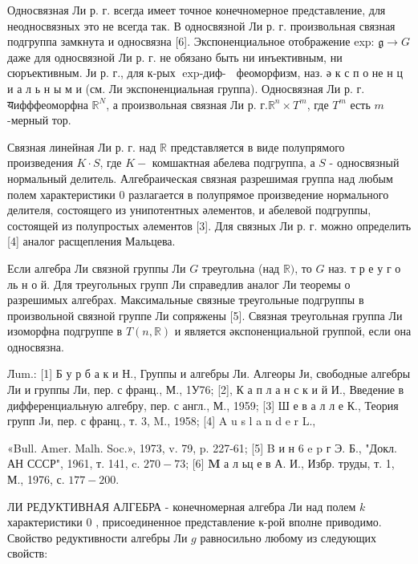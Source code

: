 \documentclass[10pt]{article}
\begin{document}
Односвязная Ли р. г. всегда имеет точное конечномерное представление, для неодносвязных это не всегда так. В односвязной Ли р. г. произвольная связная подгруппа замкнута и односвязна [6]. Экспоненциальное отображение exp: $\mathfrak{g} \rightarrow G$ даже для односвязной Ли р. г. не обязано быть ни инъективным, ни сюръективным. Ји р. г., для к-рых $\operatorname{exp-диф-~}$ феоморфизм, наз. ә к с п о не н ц и а л ь н ы м и (см. Ли экспоненциальная группа). Односвязная Ли р. г. यифффеоморфна $\mathbb{R}^{N}$, а произвольная связная Ли р. г.$\mathbb{R}^{n} \times T^{m}$, где $T^{m}$ есть $m$-мерный тор.



Связная линейная Ли р. г. над $\mathbb{R}$ представляется в виде полупрямого произведения $K \cdot S$, где $K-$ комшактная абелева подгруппа, а $S$ - односвязный нормальный делитель. Алгебраическая связная разрешимая группа над любым полем характеристики 0 разлагается в полупрямое произведение нормального делителя, состоящего из унипотентных әлементов, и абелевой подгруппы, состоящей из полупростых әлементов [3]. Для связных Ли р. г. можно определить [4] аналог расщепления Мальцева.



Если алгебра Ли связной группы Ли $G$ треугольна (над $\mathbb{R})$, то $G$ наз. т р е у г о ль н о й. Для треугольных групп Ли справедлив аналог Ли теоремы о разрешимых алгебрах. Максимальные связные треугольные подгруппы в произвольной связной группе Ли сопряжены [5]. Связная треугольная группа Ли изоморфна подгруппе в $T(n, \mathbb{R})$ и является әкспоненциальной группой, если она односвязна.



Лum.: [1] Б у р б а к и Н., Группы и алгебры Ли. Алгеоры Ји, свободные алгебры Ли и группы Ли, пер. с франц., М., 1У76; [2], К а п л а н с к и й И., Введение в дифференциальную алгебру, пер. с англ., М., 1959; [3] Ш е в а л л е К., Теория групп Jи, пер. с франц., т. 3, M., 1958; [4] A u s l a n d e r L.,

«Bull. Amer. Malh. Soc.», 1973, v. 79, p. 227-61; [5] B и н 6 e p г Э. Б., "Докл. АН СССР", 1961, т. 141, c. $270-73$; [6] $\mathbf{M}$ а л ьц е в А. И., Избр. труды, т. 1, М., 1976, с. $177-200$.



ЛИ РЕДУКТИВНАЯ АЛГЕБРА - конечномерная алгебра Ли над полем $k$ характеристики 0 , присоединенное представление к-рой вполне приводимо. Свойство редуктивности алгебры Ли $g$ равносильно любому из следующих свойств:
\end{document}
